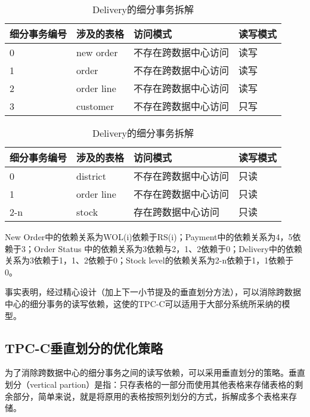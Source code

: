 \begin{table}[htb]
  \centering\small
  \caption{Delivery的细分事务拆解}
  \label{tab:exampletable}
  \begin{tabular}{p{90pt}p{90pt}p{120pt}p{90pt}}
    \toprule
    细分事务编号   & 涉及的表格 & 访问模式 & 读写模式\\
    \midrule
    0 & new order     & 不存在跨数据中心访问 &读写 \\
    1 & order    & 不存在跨数据中心访问 &读写\\
    2 & order line        & 不存在跨数据中心访问 &读写   \\
    3 & customer   & 不存在跨数据中心访问 &只写 \\
    \bottomrule
  \end{tabular}
\end{table}

\begin{table}[htb]
  \centering\small
  \caption{Delivery的细分事务拆解}
  \label{tab:exampletable}
  \begin{tabular}{p{90pt}p{90pt}p{120pt}p{90pt}}
    \toprule
    细分事务编号   & 涉及的表格 & 访问模式 & 读写模式\\
    \midrule
    0 & district     & 不存在跨数据中心访问 &只读 \\
    1 & order line    & 不存在跨数据中心访问 &只读\\
    2-n & stock        & 存在跨数据中心访问 &只读  \\

    \bottomrule
  \end{tabular}
\end{table}
New Order中的依赖关系为WOL(i)依赖于RS(i)；Payment中的依赖关系为4，5依赖于3；Order Status 中的依赖关系为3依赖与2，1、2依赖于0；Delivery中的依赖关系为3依赖于1，1、2依赖于0；Stock level的依赖关系为2-n依赖于1，1依赖于0。

事实表明，经过精心设计（加上下一小节提及的垂直划分方法），可以消除跨数据中心的细分事务的读写依赖，这使的TPC-C可以适用于大部分系统所采纳的模型。


\subsection{TPC-C垂直划分的优化策略}

为了消除跨数据中心的细分事务之间的读写依赖，可以采用垂直划分的策略。\cite{Partition}垂直划分（vertical partion）是指：只存表格的一部分而使用其他表格来存储表格的剩余部分，简单来说，就是将原用的表格按照列划分的方式，拆解成多个表格来存储。

